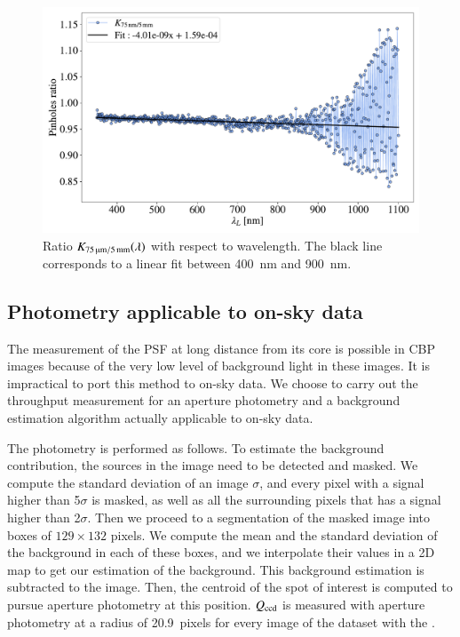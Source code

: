 \begin{figure}[h]
    \centering
    \includegraphics[width=\columnwidth]{fig/ratio_pinholes.pdf}
    \caption{Ratio $K_\mathrm{\SI{75}{\micro\meter}/\SI{5}{\milli\meter}}(\lambda)$ with respect to wavelength. The black line corresponds to a linear fit between \SI{400}{\nm} and \SI{900}{\nm}.}
    \label{fig:ratio_pinholes}
\end{figure}


\subsection{Photometry applicable to on-sky data}
\label{sec:photometry_small}

The measurement of the PSF at long distance from its core is possible in CBP images because of the very low level of background light in these images. It is impractical to port this method to on-sky data. We choose to carry out the throughput measurement for an aperture photometry and a background estimation algorithm actually applicable to on-sky data. 

The photometry is performed as follows. To estimate the background contribution, the sources in the image need to be detected and masked. We compute the standard deviation of an image $\sigma$, and every pixel with a signal higher than 5$\sigma$ is masked, as well as all the surrounding pixels that has a signal higher than 2$\sigma$. Then we proceed to a segmentation of the masked image into boxes of $129\times132$ pixels. We compute the mean and the standard deviation of the background in each of these boxes, and we interpolate their values in a 2D map to get our estimation of the background. This background estimation is subtracted to the image. Then, the centroid of the spot of interest is computed to pursue aperture photometry at this position. $Q_{\mathrm{ccd}}$ is measured with aperture photometry at a radius of \SI{20.9}{pixels} for every image of the dataset with the \spinhole.

